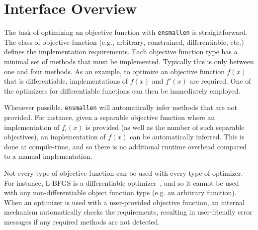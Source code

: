 \section{Interface Overview}
\label{sec:api}


% 


The task of optimizing an objective function with {\tt ensmallen} is
straightforward.  The class of objective function (e.g., arbitrary, constrained,
differentiable, etc.) defines the implementation requirements.
Each objective function type has a minimal set of methods that must be implemented.
Typically this is only between one and four methods.
As an example,
to optimize an objective function $f(x)$ that is differentiable,
implementations of $f(x)$ and $f'(x)$ are required.
One of the optimizers for differentiable functions can then be immediately employed.

Whenever possible, {\tt ensmallen} will automatically infer methods that are
not provided.  For instance, given a separable objective function where an
implementation of $f_i(x)$ is provided (as well as the number of such separable
objectives), an implementation of $f(x)$ can be automatically inferred.
This is done at compile-time, and so there is no additional runtime overhead
compared to a manual implementation.

Not every type of objective function can be used with every type of optimizer.
For instance, L-BFGS is a differentiable optimizer~\cite{liu1989limited},
and so it cannot be used with any non-differentiable object function type
(e.g. an arbitrary function).
When an optimizer is used with a user-provided objective function,
an internal mechanism automatically checks the requirements,
resulting in user-friendly error messages if any required methods are not detected.


